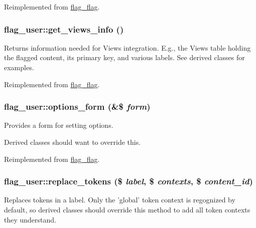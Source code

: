 Reimplemented from \hyperlink{group__actions_g8f1b472c7f072dbfa682cc5b3fac9be6}{flag\_\-flag}.\hypertarget{classflag__user_6964b8042fb9bb01e197705be533abba}{
\subsubsection[{get\_\-views\_\-info}]{\setlength{\rightskip}{0pt plus 5cm}flag\_\-user::get\_\-views\_\-info ()}}
\label{classflag__user_6964b8042fb9bb01e197705be533abba}


Returns information needed for Views integration. E.g., the Views table holding the flagged content, its primary key, and various labels. See derived classes for examples. 

Reimplemented from \hyperlink{group__views_g91f53a4d24f7c81f8a913e56154821c0}{flag\_\-flag}.\hypertarget{classflag__user_2a425815ad46c2ffd8f48ded77d06231}{
\subsubsection[{options\_\-form}]{\setlength{\rightskip}{0pt plus 5cm}flag\_\-user::options\_\-form (\&\$ {\em form})}}
\label{classflag__user_2a425815ad46c2ffd8f48ded77d06231}


Provides a form for setting options.

Derived classes should want to override this. 

Reimplemented from \hyperlink{classflag__flag_28aec91da5bc068c6c2a9a707ef62345}{flag\_\-flag}.\hypertarget{classflag__user_7f311816450a6101d5ea132a41016d51}{
\subsubsection[{replace\_\-tokens}]{\setlength{\rightskip}{0pt plus 5cm}flag\_\-user::replace\_\-tokens (\$ {\em label}, \/  \$ {\em contexts}, \/  \$ {\em content\_\-id})}}
\label{classflag__user_7f311816450a6101d5ea132a41016d51}


Replaces tokens in a label. Only the 'global' token context is regognized by default, so derived classes should override this method to add all token contexts they understand. 

